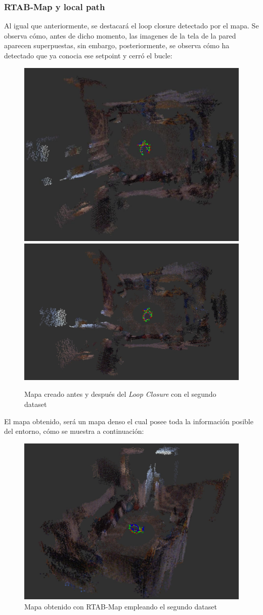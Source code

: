 \subsubsection{RTAB-Map y local path}
Al igual que anteriormente, se destacará el loop closure detectado por el mapa. Se observa cómo, antes de dicho momento, las imagenes de la tela de la pared aparecen superpuestas,
sin embargo, posteriormente, se observa cómo ha detectado que ya conocia ese setpoint y cerró el bucle:
\begin{figure}[h!]
    \centering
    \includegraphics[width=.4\textwidth]{images/slam/bag3_rtabmap_noLC}
    \includegraphics[width=.51\textwidth]{images/slam/bag3_rtabmap_LC}
    \caption{Mapa creado antes y después del \textit{Loop Closure} con el segundo dataset}
\end{figure}

El mapa obtenido, será un mapa denso el cual posee toda la información posible del entorno, cómo se muestra a continuación:

\begin{figure}[h!]
    \centering
    \includegraphics[width=.7\textwidth]{images/slam/bag3_rtabmapbonito}
    \caption{Mapa obtenido con RTAB-Map empleando el segundo dataset}
\end{figure}

